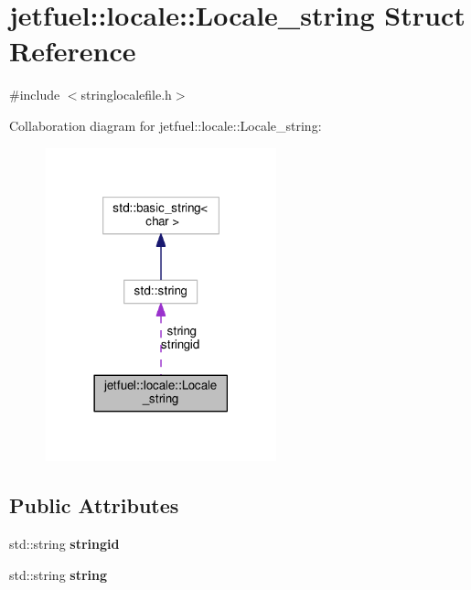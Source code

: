 \hypertarget{structjetfuel_1_1locale_1_1Locale__string}{}\section{jetfuel\+:\+:locale\+:\+:Locale\+\_\+string Struct Reference}
\label{structjetfuel_1_1locale_1_1Locale__string}


{\ttfamily \#include $<$stringlocalefile.\+h$>$}



Collaboration diagram for jetfuel\+:\+:locale\+:\+:Locale\+\_\+string\+:\nopagebreak
\begin{figure}[H]
\begin{center}
\leavevmode
\includegraphics[width=189pt]{structjetfuel_1_1locale_1_1Locale__string__coll__graph}
\end{center}
\end{figure}
\subsection*{Public Attributes}
\begin{DoxyCompactItemize}
\item 
\mbox{\label{structjetfuel_1_1locale_1_1Locale__string_a7e6246a99dcae8a12968a1fac0dd81cc}} 
std\+::string {\bfseries stringid}
\item 
\mbox{\label{structjetfuel_1_1locale_1_1Locale__string_a9cd781f5676a7a4b66b06559f177eaab}} 
std\+::string {\bfseries string}
\end{DoxyCompactItemize}


